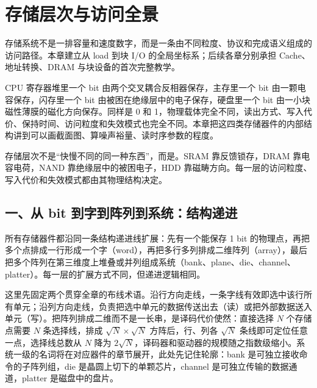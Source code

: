 \chapter{存储层次与访问全景}

\begin{keyidea}
存储系统不是一排容量和速度数字，而是一条由不同粒度、协议和完成语义组成的访问路径。本章建立从 load 到块 I/O 的全局坐标系；后续各章分别承担 Cache、地址转换、DRAM 与块设备的首次完整教学。
\end{keyidea}

CPU 寄存器堆里一个 bit 由两个交叉耦合反相器保存，主存里一个 bit 由一颗电容保存，闪存里一个 bit 由被困在绝缘层中的电子保存，硬盘里一个 bit 由一小块磁性薄膜的磁化方向保存。同样是 0 和 1，物理载体完全不同，读出方式、写入代价、保持时间、访问粒度和失效模式也完全不同。本章把这四类存储器件的内部结构讲到可以画截面图、算噪声裕量、读时序参数的程度。

\begin{keyidea}
存储层次不是“快慢不同的同一种东西”，而是。SRAM 靠反馈锁存，DRAM 靠电容电荷，NAND 靠绝缘层中的被困电子，HDD 靠磁畴方向。每一层的访问粒度、写入代价和失效模式都由其物理结构决定。
\end{keyidea}

\section{一、从 bit 到字到阵列到系统：结构递进}

所有存储器件都沿同一条结构递进线扩展：先有一个能保存 1 bit 的物理点，再把多个点排成一行形成一个字（word），再把多行多列排成二维阵列（array），最后把多个阵列在第三维度上堆叠或并列组成系统（bank、plane、die、channel、platter）。每一层的扩展方式不同，但递进逻辑相同。

这里先固定两个贯穿全章的布线术语。沿行方向走线，一条字线有效即选中该行所有单元；沿列方向走线，负责把选中单元的数据传送出去（读）或把外部数据送入单元（写）。把阵列排成二维而不是一长串，是译码代价使然：直接选择 $N$ 个存储点需要 $N$ 条选择线，排成 $\sqrt{N}\times\sqrt{N}$ 方阵后，行、列各 $\sqrt{N}$ 条线即可定位任意一点，选择线总数从 $N$ 降为 $2\sqrt{N}$，译码器和驱动器的规模随之指数级缩小。系统一级的名词将在对应器件的章节展开，此处先记住轮廓：bank 是可独立接收命令的子阵列组，die 是晶圆上切下的单颗芯片，channel 是可独立传输的数据通道，platter 是磁盘中的盘片。

